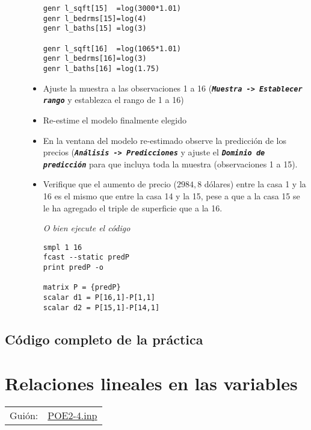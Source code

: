 \documentclass[11pt]{article}
\begin{document}
\begin{description}
\begin{itemize}
\begin{verbatim}
genr l_sqft[15]  =log(3000*1.01)
genr l_bedrms[15]=log(4)
genr l_baths[15] =log(3)

genr l_sqft[16]  =log(1065*1.01)
genr l_bedrms[16]=log(3)
genr l_baths[16] =log(1.75)
\end{verbatim}

\item Ajuste la muestra a las observaciones 1 a 16 (\textbf{\emph{\texttt{Muestra ->
    Establecer rango}}} y establezca el rango de 1 a 16)

\item Re-estime el modelo finalmente elegido

\item En la ventana del modelo re-estimado observe la predicción de los
precios (\textbf{\emph{\texttt{Análisis -> Predicciones}}} y ajuste el \textbf{\emph{\texttt{Dominio de
    predicción}}} para que incluya toda la muestra (observaciones 1 a
15).

\item Verifique que el aumento de precio (\(2984,8\) dólares) entre la
casa 1 y la 16 es el mismo que entre la casa 14 y la 15, pese a
que a la casa 15 se le ha agregado el triple de superficie que a
la 16.

\emph{O bien ejecute el código}
\begin{verbatim}
smpl 1 16
fcast --static predP
print predP -o

matrix P = {predP}
scalar d1 = P[16,1]-P[1,1]
scalar d2 = P[15,1]-P[14,1]
\end{verbatim}
\end{itemize}
\end{description}


\vspace{10pt}
\noindent
\subsection{Código completo de la práctica}
\label{sec:org38b8978}
\vspace{10pt}

\clearpage
\section{Relaciones lineales en las variables}
\label{sec:org643e246}
\begin{center}
\begin{tabular}{ll}
Guión: & \href{https://github.com/mbujosab/Ectr/tree/master/Practicas/Gretl/scripts/POE2-4.inp}{POE2-4.inp}\\
\end{tabular}
\end{center}
\end{document}
